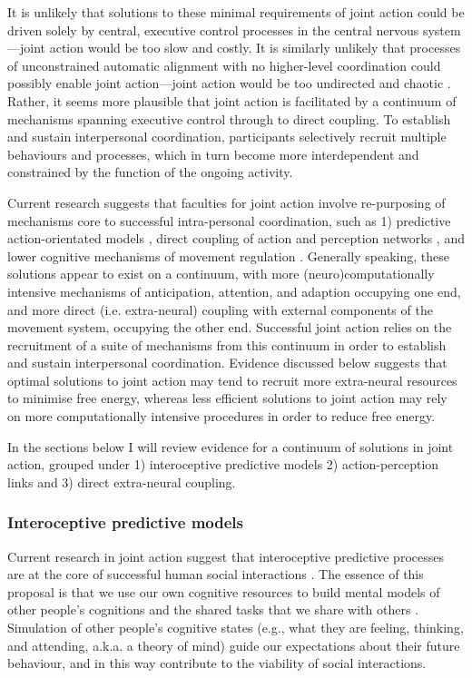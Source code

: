 \begin{CJK}{UTF8}{gbsn}
It is unlikely that solutions to these minimal requirements of joint action could be driven solely by central, executive control processes in the central nervous system---joint action would be too slow and costly. It is similarly unlikely that processes of unconstrained automatic alignment with no higher-level coordination could possibly enable joint action---joint action would be too undirected and chaotic \citep{Fusaroli2014}.  Rather, it seems more plausible that joint action is facilitated by a continuum of mechanisms spanning executive control through to direct coupling.  To establish and sustain interpersonal coordination, participants selectively recruit multiple behaviours and processes, which in turn become more interdependent and constrained by the function of the ongoing activity.

Current research suggests that faculties for joint action involve re-purposing of mechanisms core to successful intra-personal coordination, such as 1) predictive action-orientated models \citep{Vesper2012}, direct coupling of action and perception networks \citep{Novembre2014}, and lower cognitive mechanisms of movement regulation \citep{Semin2008,Riley2011}.  Generally speaking, these solutions appear to exist on a continuum, with more (neuro)computationally intensive mechanisms of anticipation, attention, and adaption occupying one end, and more direct (i.e. extra-neural) coupling with external components of the movement system, occupying the other end.  Successful joint action relies on the recruitment of a suite of mechanisms from this continuum in order to establish and sustain interpersonal coordination.  Evidence discussed below suggests that optimal solutions to joint action may tend to recruit more extra-neural resources to minimise free energy, whereas less efficient solutions to joint action may rely on more computationally intensive procedures in order to reduce free energy.

In the sections below I will review evidence for a continuum of solutions in joint action, grouped under 1) interoceptive predictive models 2) action-perception links and 3) direct extra-neural coupling.


\subsubsection{Interoceptive predictive models}
Current research in joint action suggest that interoceptive predictive processes are at the core of successful human social interactions \citep{Graziano2013,Manera2013,Sparenberg2012,Springer2012}.  The essence of this proposal is that we use our own cognitive resources to build mental models of other people’s cognitions and the shared tasks that we share with others \citep{Tomasello2005a}.  Simulation of other people’s cognitive states (e.g., what they are feeling, thinking, and attending, a.k.a. a theory of mind) guide our expectations about their future behaviour, and in this way contribute to the viability of social interactions.


\end{CJK}
